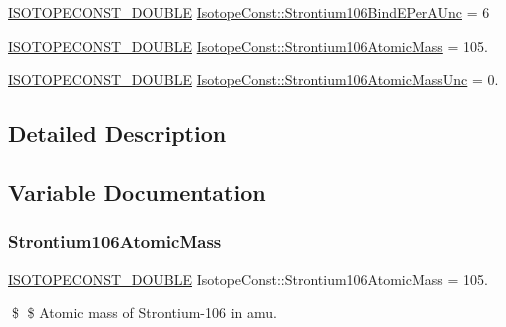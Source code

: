 \begin{DoxyCompactItemize}
\mbox{\hyperlink{group___isotope_const-_macros_ga8f45a7272ce02c0b4c65c44636ed719a}{I\+S\+O\+T\+O\+P\+E\+C\+O\+N\+S\+T\+\_\+\+D\+O\+U\+B\+LE}} \mbox{\hyperlink{group___isotope_const-_strontium-_sr106_gaf57617eaf9f5cf6c90d85afd580a6e5d}{Isotope\+Const\+::\+Strontium106\+Bind\+E\+Per\+A\+Unc}} = 6
\item 
\mbox{\hyperlink{group___isotope_const-_macros_ga8f45a7272ce02c0b4c65c44636ed719a}{I\+S\+O\+T\+O\+P\+E\+C\+O\+N\+S\+T\+\_\+\+D\+O\+U\+B\+LE}} \mbox{\hyperlink{group___isotope_const-_strontium-_sr106_gae0bb7d993100312f7f33b3ba4315b266}{Isotope\+Const\+::\+Strontium106\+Atomic\+Mass}} = 105.
\item 
\mbox{\hyperlink{group___isotope_const-_macros_ga8f45a7272ce02c0b4c65c44636ed719a}{I\+S\+O\+T\+O\+P\+E\+C\+O\+N\+S\+T\+\_\+\+D\+O\+U\+B\+LE}} \mbox{\hyperlink{group___isotope_const-_strontium-_sr106_gafccd6dad1a42e4893d07d5f8009b7484}{Isotope\+Const\+::\+Strontium106\+Atomic\+Mass\+Unc}} = 0.
\end{DoxyCompactItemize}


\subsection{Detailed Description}


\subsection{Variable Documentation}
\mbox{\label{group___isotope_const-_strontium-_sr106_gae0bb7d993100312f7f33b3ba4315b266}} 
\subsubsection{\texorpdfstring{Strontium106\+Atomic\+Mass}{Strontium106AtomicMass}}
{\footnotesize\ttfamily \mbox{\hyperlink{group___isotope_const-_macros_ga8f45a7272ce02c0b4c65c44636ed719a}{I\+S\+O\+T\+O\+P\+E\+C\+O\+N\+S\+T\+\_\+\+D\+O\+U\+B\+LE}} Isotope\+Const\+::\+Strontium106\+Atomic\+Mass = 105.}

\$ \$ Atomic mass of Strontium-\/106 in amu. \mbox{\label{group___isotope_const-_strontium-_sr106_gafccd6dad1a42e4893d07d5f8009b7484}} 
